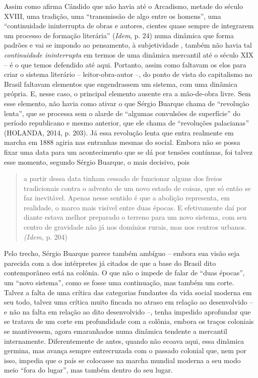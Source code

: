 Assim como afirma Cândido que não havia até o Arcadismo, metade do
século XVIII, uma tradição, uma ``transmissão de algo entre os homens'',
uma ``continuidade ininterrupta de obras e autores, cientes quase sempre
de integrarem um processo de formação literária'' (\emph{Idem}, p. 24)
numa dinâmica que forma padrões e vai se impondo ao pensamento, à
subjetividade , também não havia tal \emph{continuidade ininterrupta} em
termos de uma dinâmica mercantil até o século XIX -- é o que temos
defendido até aqui. Portanto, assim como faltavam os elos para criar o
sistema literário -- leitor-obra-autor --, do ponto de vista do
capitalismo no Brasil faltavam elementos que engendrassem um sistema,
com uma dinâmica própria. E, nesse caso, o principal elemento ausente
era a mão-de-obra livre. Sem esse elemento, não havia como ativar o que
Sérgio Buarque chama de ``revolução lenta'', que se processa sem o
alarde de ``algumas convulsões de superfície'' do período republicano e
mesmo anterior, que ele chama de ``revoluções palacianas'' (HOLANDA,
2014, p. 203). Já essa revolução lenta que entra realmente em marcha em
1888 agiria nas entranhas mesmas do social. Embora não se possa fixar
uma data para um acontecimento que se dá por tensões contínuas, foi
talvez esse momento, segundo Sérgio Buarque, o mais decisivo, pois

\begin{quote}
a partir dessa data tinham cessado de funcionar alguns dos freios
tradicionais contra o advento de um novo estado de coisas, que só então
se faz inevitável. Apenas nesse sentido é que a abolição representa, em
realidade, o marco mais visível entre duas épocas. E efetivamente daí
por diante estava melhor preparado o terreno para um novo sistema, com
seu centro de gravidade não já nos domínios rurais, mas nos centros
urbanos. \emph{(Idem,} p. 204)
\end{quote}

Pelo trecho, Sérgio Buarque parece também ambíguo -- embora sua visão
seja parecida com a dos intérpretes já citados de que a base do Brasil
dito contemporâneo está na colônia. O que não o impede de falar de
``duas épocas'', um ``novo sistema'', como se fosse uma continuação, mas
também um corte. Talvez a falta de uma crítica das categorias fundantes
da vida social moderna em seu todo, talvez uma crítica muito fincada no
atraso em relação ao desenvolvido -- e não na falta em relação ao dito
desenvolvido --, tenha impedido aprofundar que se tratava de um corte em
profundidade com a colônia, embora os traços coloniais se mantivessem,
agora emaranhados numa dinâmica tendente a mercantil internamente.
Diferentemente de antes, quando não ecoava aqui, essa dinâmica germina,
mas avança sempre entrecruzada com o passado colonial que, nem por isso,
impedia que o país se colocasse na marcha mundial moderna a seu modo
meio ``fora do lugar'', mas também dentro do seu lugar.

